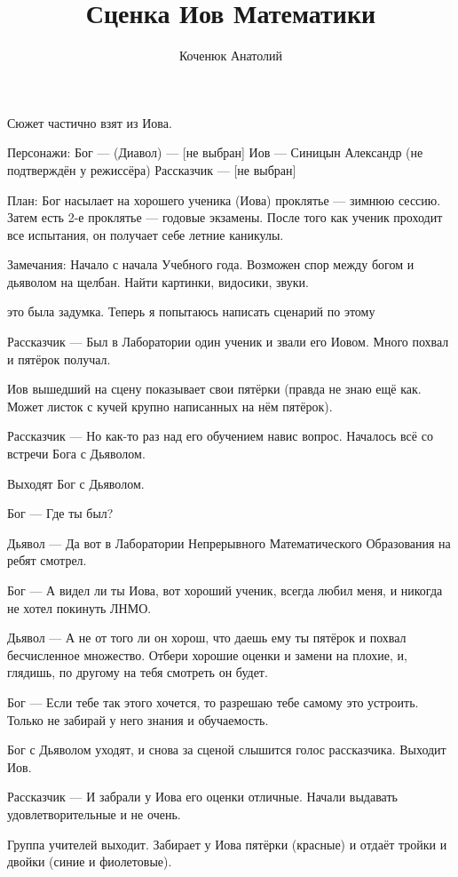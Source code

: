 \documentclass[10pt,a4paper]{article}
\author{Коченюк Анатолий}
\title{Сценка Иов Математики}
\begin{document}
 \maketitle
 Сюжет частично взят из Иова.

Персонажи:
Бог — 
(Диавол) — [не выбран]
Иов — Синицын Александр (не подтверждён у режиссёра)
Рассказчик — [не выбран]

План:
Бог насылает на хорошего ученика (Иова) проклятье — зимнюю сессию.
Затем есть 2-е  проклятье — годовые экзамены.
После того как ученик проходит все испытания, он получает себе летние каникулы.

Замечания:
Начало с начала Учебного года.
Возможен спор между богом и дьяволом на щелбан.
Найти картинки, видосики, звуки.








это была задумка. Теперь я попытаюсь написать сценарий по этому

Рассказчик — Был в Лаборатории один ученик и звали его Иовом. Много похвал и пятёрок получал.

Иов вышедший на сцену показывает свои пятёрки (правда не знаю ещё как. Может листок с кучей крупно написанных на нём пятёрок).

Рассказчик — Но как-то раз над его обучением навис вопрос. Началось всё со встречи Бога с Дьяволом.

Выходят Бог с Дьяволом.

Бог — Где ты был?

Дьявол — Да вот в Лаборатории Непрерывного Математического Образования на ребят смотрел.

Бог — А видел ли ты Иова, вот хороший ученик, всегда любил меня, и никогда не хотел покинуть ЛНМО.

Дьявол — А не от того ли он хорош, что даешь ему ты пятёрок и похвал бесчисленное множество. Отбери хорошие оценки и замени на плохие, и, глядишь, по другому на тебя смотреть он будет.

Бог — Если тебе так этого хочется, то разрешаю тебе самому это устроить. Только не забирай у него знания и обучаемость.

Бог с Дьяволом уходят, и снова за сценой слышится голос рассказчика. Выходит Иов.

Рассказчик — И забрали у Иова его оценки отличные. Начали выдавать удовлетворительные и не очень.

Группа учителей выходит. Забирает у Иова пятёрки (красные) и отдаёт тройки и двойки (синие и фиолетовые).
\end{document}
